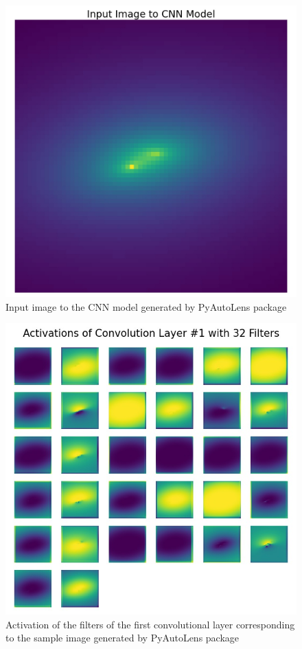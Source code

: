 \documentclass[12pt]{article}
\begin{document}
\begin{figure}[thb]
    \centering
    \includegraphics[width=\textwidth]{../figures/conv_input.jpg}
    \caption{Input image to the CNN model generated by PyAutoLens\cite{pyautolens} package}
    \label{fig:conv_inp}
\end{figure}

\begin{figure}[thb]
    \centering
    \includegraphics[width=\textwidth]{../figures/conv_activ1.jpg}
    \caption{Activation of the filters of the first convolutional layer corresponding to the sample image generated by PyAutoLens\cite{pyautolens} package}
    \label{fig:conv1}
\end{figure}
\end{document}
